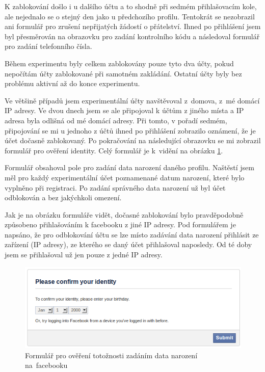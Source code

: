 \documentclass[thesis=M,czech]{FITthesis}[2013/05/10]
\begin{document}
K zablokování došlo i u dalšího účtu a to shodně při sedmém přihlašovacím kole, ale nejednalo se o stejný den jako u předchozího profilu. Tentokrát se nezobrazil ani formulář pro zrušení nepřijatých žádostí o přátelství. Ihned po přihlášení jsem byl přesměrován na obrazovku pro zadání kontrolního kódu a následoval formulář pro zadání telefonního čísla.

Během experimentu byly celkem zablokovány pouze tyto dva účty, pokud nepočítám účty zablokované při samotném zakládání. Ostatní účty byly bez problému aktivní až do konce experimentu.

Ve většině případů jsem experimentální účty navštěvoval z~domova, z~mé domácí IP adresy. Ve dvou dnech jsem se ale připojoval k účtům z jiného místa a IP adresa byla odlišná od mé domácí adresy. Při tomto, v pořadí sedmém, připojování se mi u jednoho z účtů ihned po přihlášení zobrazilo oznámení, že je účet dočasně zablokovaný. Po pokračování na následující obrazovku se mi zobrazil formulář pro ověření identity. Celý formulář je k~vidění na obrázku \ref{fig:confirmIdentity}.

Formulář obsahoval pole pro zadání data narození daného profilu. Naštěstí jsem měl pro každý experimentální účet poznamenané datum narození, které bylo vyplněno při registraci. Po zadání správného data narození už byl účet odblokován a bez jakýchkoli omezení. 

Jak je na obrázku formuláře vidět, dočasné zablokování bylo pravděpodobně způsobeno přihlašováním k facebooku z jiné IP adresy. Pod formulářem je napsáno, že pro odblokování účtu se lze místo zadávání data narození přihlásit ze zařízení (IP adresy), ze kterého se daný účet přihlašoval naposledy. Od té doby jsem se přihlašoval už jen pouze z jedné IP adresy.

\begin{figure}[h]
\begin{center}
\includegraphics[width=5in]{figures/confirmIdentity.png}
\caption{Formulář pro ověření totožnosti zadáním data narození na~facebooku}
\label{fig:confirmIdentity}
\end{center}
\end{figure}
\end{document}
